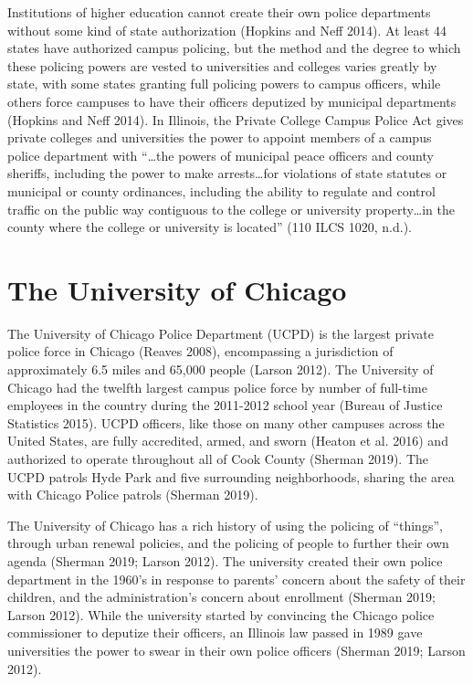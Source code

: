 \documentclass{ucetd}
\begin{document}
Institutions of higher education cannot create their own police
departments without some kind of state authorization (Hopkins and Neff
2014). At least 44 states have authorized campus policing, but the
method and the degree to which these policing powers are vested to
universities and colleges varies greatly by state, with some states
granting full policing powers to campus officers, while others force
campuses to have their officers deputized by municipal departments
(Hopkins and Neff 2014). In Illinois, the Private College Campus Police
Act gives private colleges and universities the power to appoint members
of a campus police department with ``\ldots the powers of municipal
peace officers and county sheriffs, including the power to make
arrests\ldots for violations of state statutes or municipal or county
ordinances, including the ability to regulate and control traffic on the
public way contiguous to the college or university property\ldots in the
county where the college or university is located'' (110 ILCS 1020,
n.d.).

\hypertarget{the-university-of-chicago}{%
\section{The University of Chicago}\label{the-university-of-chicago}}

The University of Chicago Police Department (UCPD) is the largest
private police force in Chicago (Reaves 2008), encompassing a
jurisdiction of approximately 6.5 miles and 65,000 people (Larson 2012).
The University of Chicago had the twelfth largest campus police force by
number of full-time employees in the country during the 2011-2012 school
year (Bureau of Justice Statistics 2015). UCPD officers, like those on
many other campuses across the United States, are fully accredited,
armed, and sworn (Heaton et al. 2016) and authorized to operate
throughout all of Cook County (Sherman 2019). The UCPD patrols Hyde Park
and five surrounding neighborhoods, sharing the area with Chicago Police
patrols (Sherman 2019).

The University of Chicago has a rich history of using the policing of
``things'', through urban renewal policies, and the policing of people
to further their own agenda (Sherman 2019; Larson 2012). The university
created their own police department in the 1960's in response to
parents' concern about the safety of their children, and the
administration's concern about enrollment (Sherman 2019; Larson 2012).
While the university started by convincing the Chicago police
commissioner to deputize their officers, an Illinois law passed in 1989
gave universities the power to swear in their own police officers
(Sherman 2019; Larson 2012).
\end{document}
